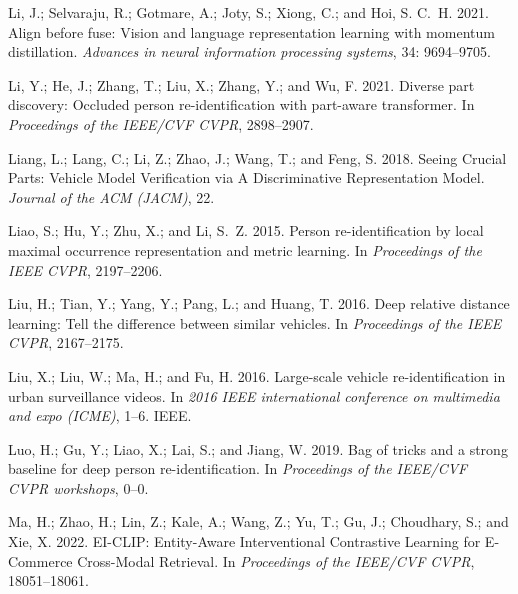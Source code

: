 \documentclass[letterpaper]{article} \usepackage{aaai23}  \usepackage{times}  \usepackage{helvet}  \usepackage{courier}  \usepackage[hyphens]{url}  \usepackage{graphicx} \urlstyle{rm} \def\UrlFont{\rm}  \usepackage{natbib}  \usepackage{caption} \frenchspacing  \setlength{\pdfpagewidth}{8.5in}  \setlength{\pdfpageheight}{11in}  \usepackage{algorithm}
\begin{document}
\begin{small}
\begin{thebibliography}{65}
Li, J.; Selvaraju, R.; Gotmare, A.; Joty, S.; Xiong, C.; and Hoi, S. C.~H.
  2021{}.
\newblock Align before fuse: Vision and language representation learning with
  momentum distillation.
\newblock \emph{Advances in neural information processing systems}, 34:
  9694--9705.

Li, Y.; He, J.; Zhang, T.; Liu, X.; Zhang, Y.; and Wu, F. 2021{}.
\newblock Diverse part discovery: Occluded person re-identification with
  part-aware transformer.
\newblock In \emph{Proceedings of the IEEE/CVF CVPR}, 2898--2907.

Liang, L.; Lang, C.; Li, Z.; Zhao, J.; Wang, T.; and Feng, S. 2018.
\newblock Seeing Crucial Parts: Vehicle Model Verification via A Discriminative
  Representation Model.
\newblock \emph{Journal of the ACM (JACM)}, 22.

Liao, S.; Hu, Y.; Zhu, X.; and Li, S.~Z. 2015.
\newblock Person re-identification by local maximal occurrence representation
  and metric learning.
\newblock In \emph{Proceedings of the IEEE CVPR}, 2197--2206.

Liu, H.; Tian, Y.; Yang, Y.; Pang, L.; and Huang, T. 2016{}.
\newblock Deep relative distance learning: Tell the difference between similar
  vehicles.
\newblock In \emph{Proceedings of the IEEE CVPR}, 2167--2175.

Liu, X.; Liu, W.; Ma, H.; and Fu, H. 2016{}.
\newblock Large-scale vehicle re-identification in urban surveillance videos.
\newblock In \emph{2016 IEEE international conference on multimedia and expo
  (ICME)}, 1--6. IEEE.

Luo, H.; Gu, Y.; Liao, X.; Lai, S.; and Jiang, W. 2019.
\newblock Bag of tricks and a strong baseline for deep person
  re-identification.
\newblock In \emph{Proceedings of the IEEE/CVF CVPR workshops}, 0--0.

Ma, H.; Zhao, H.; Lin, Z.; Kale, A.; Wang, Z.; Yu, T.; Gu, J.; Choudhary, S.;
  and Xie, X. 2022.
\newblock EI-CLIP: Entity-Aware Interventional Contrastive Learning for
  E-Commerce Cross-Modal Retrieval.
\newblock In \emph{Proceedings of the IEEE/CVF CVPR}, 18051--18061.


\end{thebibliography}
\end{small}
\end{document}
